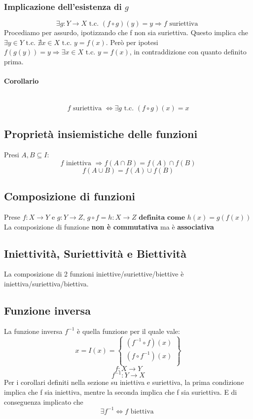 \documentclass{report}
\newcommand{\subsubsubsection}[1]{\paragraph{#1}\mbox{}\\}
\begin{document}
        \subsubsection{Implicazione dell'esistenza di $g$}
            $$\exists g: Y \longrightarrow X \textrm{ t.c. } \left(f \circ g\right)\left(y\right) = y \Longrightarrow f \textrm{ suriettiva }$$
            Procediamo per assurdo, ipotizzando che f non sia suriettiva.
            Questo implica che $\exists y \in Y \textrm{ t.c. } \nexists x \in X \textrm{ t.c. } y = f\left(x\right)$.
            Però per ipotesi $f\left(g\left(y\right)\right) = y \Longrightarrow \exists x \in X \textrm{ t.c. } y = f\left(x\right)$, 
            in contraddizione con quanto definito prima.
            \subsubsubsection{Corollario}
                $$f \textrm{ suriettiva } \Longleftrightarrow \exists g \textrm{ t.c. } \left(f \circ g\right)\left(x\right) = x$$
    \subsection{Proprietà insiemistiche delle funzioni}
        Presi $A,B \subseteq I$:
        $$f \textrm{ iniettiva } \Longrightarrow f\left(A \cap B\right) = f\left(A\right) \cap f\left(B\right)$$
        $$f\left(A \cup B\right) = f\left(A\right) \cup f\left(B\right)$$
    \subsection{Composizione di funzioni}
        Prese $f: X \longrightarrow Y$ e $g: Y \longrightarrow Z, \, g \circ f = 
        h: X \longrightarrow Z \textbf{ definita come } h\left(x\right) = g\left(f\left(x\right)\right)$ \\
        La composizione di funzione \textbf{non è commutativa} ma è \textbf{associativa} \\
        \subsection{Iniettività, Suriettività e Biettività}
            La composizione di 2 funzioni iniettive/suriettive/biettive è iniettiva/suriettiva/biettiva.
    \subsection{Funzione inversa}
        La funzione inversa $f^{-1}$ è quella funzione per il quale vale:
        $$x = I\left(x\right) = \left\{\begin{matrix} \left(f^{-1} \circ f\right)\left(x\right)  \\  \left(f \circ f^{-1}\right)\left(x\right)  \\ \end{matrix}\right\}$$
        $$f: X \longrightarrow Y$$
        $$f^{-1}: Y \longrightarrow X$$
        Per i corollari definiti nella sezione su iniettiva e suriettiva, la prima condizione implica che f sia iniettiva, 
        mentre la seconda implica che f sia suriettiva. E di conseguenza implicato che 
        $$\exists f^{-1} \Longleftrightarrow f \textrm{ biettiva }$$
\end{document}
